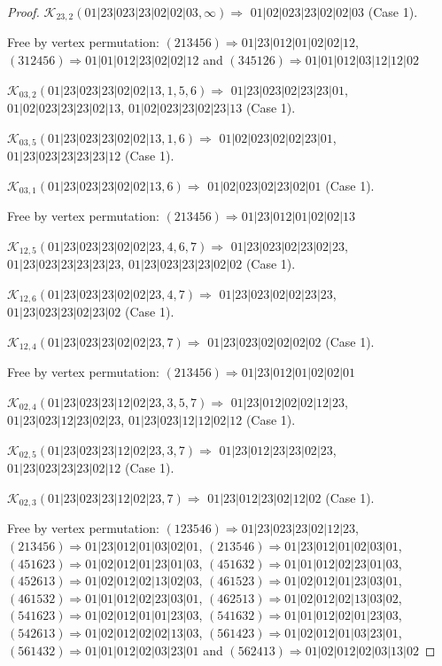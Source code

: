 \documentclass[12pt]{article}
\theoremstyle{plain}
\theoremstyle{definition}
\theoremstyle{remark}
\newcommand{\fancy}[1]{\mathcal{#1}}
\def\K{\fancy{K}}
\begin{document}
\begin{proof}
	$\K_{23,2}(01|23|023|23|02|02|03,\infty)\Rightarrow $ $01|02|023|23|02|02|03$ (Case 1).
	
	
	
	Free by vertex permutation: $(2 1 3 4 5 6)\Rightarrow 01|23|012|01|02|02|12$, $(3 1 2 4 5 6)\Rightarrow 01|01|012|23|02|02|12$ and $(3 4 5 1 2 6)\Rightarrow 01|01|012|03|12|12|02$
	
	
	
	\bigskip
	
	$\K_{03,2}(01|23|023|23|02|02|13,1, 5, 6)\Rightarrow $ $01|23|023|02|23|23|01$, $01|02|023|23|23|02|13$, $01|02|023|23|02|23|13$ (Case 1).
	
	$\K_{03,5}(01|23|023|23|02|02|13,1, 6)\Rightarrow $ $01|02|023|02|02|23|01$, $01|23|023|23|23|23|12$ (Case 1).
	
	$\K_{03,1}(01|23|023|23|02|02|13,6)\Rightarrow $ $01|02|023|02|23|02|01$ (Case 1).
	
	
	
	Free by vertex permutation: $(2 1 3 4 5 6)\Rightarrow 01|23|012|01|02|02|13$
	
	
	
	\bigskip
	
	$\K_{12,5}(01|23|023|23|02|02|23,4, 6, 7)\Rightarrow $ $01|23|023|02|23|02|23$, $01|23|023|23|23|23|23$, $01|23|023|23|23|02|02$ (Case 1).
	
	$\K_{12,6}(01|23|023|23|02|02|23,4, 7)\Rightarrow $ $01|23|023|02|02|23|23$, $01|23|023|23|02|23|02$ (Case 1).
	
	$\K_{12,4}(01|23|023|23|02|02|23,7)\Rightarrow $ $01|23|023|02|02|02|02$ (Case 1).
	
	
	
	Free by vertex permutation: $(2 1 3 4 5 6)\Rightarrow 01|23|012|01|02|02|01$
	
	
	
	\bigskip
	
	$\K_{02,4}(01|23|023|23|12|02|23,3, 5, 7)\Rightarrow $ $01|23|012|02|02|12|23$, $01|23|023|12|23|02|23$, $01|23|023|12|12|02|12$ (Case 1).
	
	$\K_{02,5}(01|23|023|23|12|02|23,3, 7)\Rightarrow $ $01|23|012|23|23|02|23$, $01|23|023|23|23|02|12$ (Case 1).
	
	$\K_{02,3}(01|23|023|23|12|02|23,7)\Rightarrow $ $01|23|012|23|02|12|02$ (Case 1).
	
	
	
	Free by vertex permutation: $(1 2 3 5 4 6)\Rightarrow 01|23|023|23|02|12|23$, $(2 1 3 4 5 6)\Rightarrow 01|23|012|01|03|02|01$, $(2 1 3 5 4 6)\Rightarrow 01|23|012|01|02|03|01$, $(4 5 1 6 2 3)\Rightarrow 01|02|012|01|23|01|03$, $(4 5 1 6 3 2)\Rightarrow 01|01|012|02|23|01|03$, $(4 5 2 6 1 3)\Rightarrow 01|02|012|02|13|02|03$, $(4 6 1 5 2 3)\Rightarrow 01|02|012|01|23|03|01$, $(4 6 1 5 3 2)\Rightarrow 01|01|012|02|23|03|01$, $(4 6 2 5 1 3)\Rightarrow 01|02|012|02|13|03|02$, $(5 4 1 6 2 3)\Rightarrow 01|02|012|01|01|23|03$, $(5 4 1 6 3 2)\Rightarrow 01|01|012|02|01|23|03$, $(5 4 2 6 1 3)\Rightarrow 01|02|012|02|02|13|03$, $(5 6 1 4 2 3)\Rightarrow 01|02|012|01|03|23|01$, $(5 6 1 4 3 2)\Rightarrow 01|01|012|02|03|23|01$ and $(5 6 2 4 1 3)\Rightarrow 01|02|012|02|03|13|02$
	

\end{proof}
\end{document}
